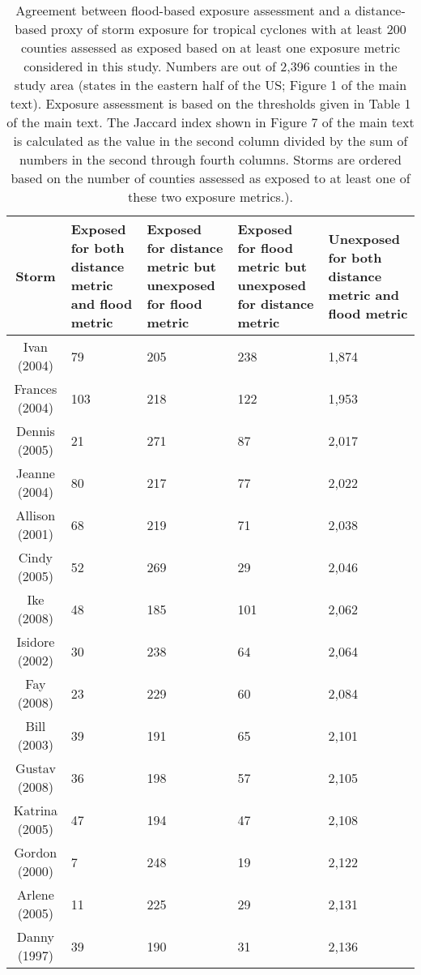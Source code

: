 \begin{table}[ht]
\centering
\caption{Agreement between flood-based exposure assessment and a distance-based
         proxy of storm exposure for tropical cyclones with at least 200 counties assessed 
         as exposed based on at least one exposure metric considered in this study. Numbers 
         are out of 2,396 counties in the study area (states in the eastern half of the US; 
         Figure 1 of the main text). Exposure assessment is based on the thresholds given in 
         Table 1 of the main text. The Jaccard index shown in Figure 7 of the main text is 
         calculated as the value in the second column divided by the sum of numbers in the 
         second through fourth columns.  Storms are ordered based on the number of counties 
         assessed as exposed to at least one of these two exposure metrics.).} 
\label{tab:misclassflood}
\begin{tabular}{cP{3cm}P{3cm}P{3cm}P{3cm}}
  \toprule
Storm & Exposed for both distance metric and flood metric & Exposed for distance metric but unexposed for flood metric & Exposed for flood metric but unexposed for distance metric & Unexposed for both distance metric and flood metric \\ 
  \midrule
Ivan (2004) & 79 & 205 & 238 & 1,874 \\ 
  Frances (2004) & 103 & 218 & 122 & 1,953 \\ 
  Dennis (2005) & 21 & 271 & 87 & 2,017 \\ 
  Jeanne (2004) & 80 & 217 & 77 & 2,022 \\ 
  Allison (2001) & 68 & 219 & 71 & 2,038 \\ 
  Cindy (2005) & 52 & 269 & 29 & 2,046 \\ 
  Ike (2008) & 48 & 185 & 101 & 2,062 \\ 
  Isidore (2002) & 30 & 238 & 64 & 2,064 \\ 
  Fay (2008) & 23 & 229 & 60 & 2,084 \\ 
  Bill (2003) & 39 & 191 & 65 & 2,101 \\ 
  Gustav (2008) & 36 & 198 & 57 & 2,105 \\ 
  Katrina (2005) & 47 & 194 & 47 & 2,108 \\ 
  Gordon (2000) & 7 & 248 & 19 & 2,122 \\ 
  Arlene (2005) & 11 & 225 & 29 & 2,131 \\ 
  Danny (1997) & 39 & 190 & 31 & 2,136 \\ 

\end{tabular}
\end{table}
